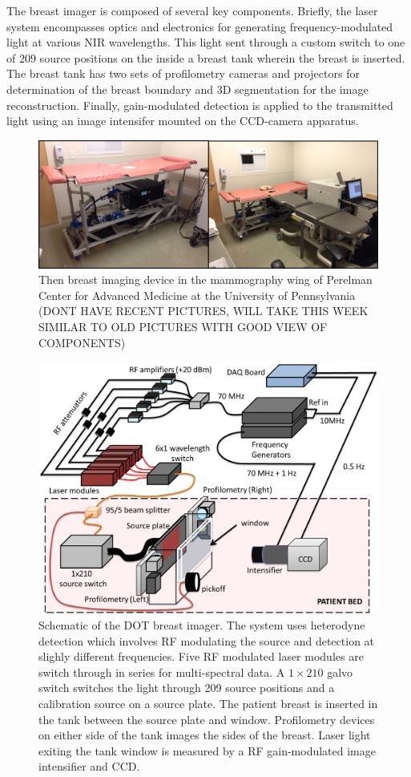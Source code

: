 The breast imager is composed of several key components. Briefly, the laser system encompasses optics and electronics for generating frequency-modulated light at various NIR wavelengths. This light sent through a custom switch to one of $209$ source positions on the inside a breast tank wherein the breast is inserted. The breast tank has two sets of profilometry cameras and projectors for determination of the breast boundary and 3D segmentation for the image reconstruction. Finally, gain-modulated detection is applied to the transmitted light using an image intensifer mounted on the CCD-camera apparatus. 
\begin{figure}[ht]
\centering
\includegraphics[width=14.5cm]{./figures/4_Gen3/gen3pic3.png}
\caption{Then breast imaging device in the mammography wing of Perelman Center for Advanced Medicine at the University of Pennsylvania (DONT HAVE RECENT PICTURES, WILL TAKE THIS WEEK SIMILAR TO OLD PICTURES WITH GOOD VIEW OF COMPONENTS)}
\label{fig:gen3pic}
\end{figure}
\begin{figure}[ht]
\centering
\includegraphics[width=14cm]{./figures/4_Gen3/gen3schem.png}
\caption{Schematic of the DOT breast imager. The system uses heterodyne detection which involves RF modulating the source and detection at slighly different frequencies. Five RF modulated laser modules are switch through in series for multi-spectral data. A $1\times 210$ galvo switch switches the light through 209 source positions and a calibration source on a source plate. The patient breast is inserted in the tank between the source plate and window. Profilometry devices on either side of the tank images the sides of the breast. Laser light exiting the tank window is measured by a RF gain-modulated image intensifier and CCD.}
\label{fig:gen3schem}
\end{figure}
